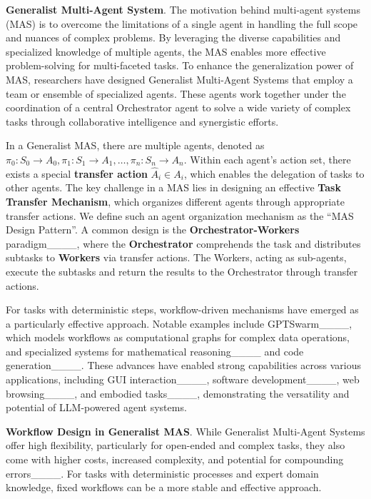 \textbf{Generalist Multi-Agent System}. The motivation behind multi-agent systems (MAS) is to overcome the limitations of a single agent in handling the full scope and nuances of complex problems. By leveraging the diverse capabilities and specialized knowledge of multiple agents, the MAS enables more effective problem-solving for multi-faceted tasks. To enhance the generalization power of MAS, researchers have designed Generalist Multi-Agent Systems that employ a team or ensemble of specialized agents. These agents work together under the coordination of a central Orchestrator agent to solve a wide variety of complex tasks through collaborative intelligence and synergistic efforts.

In a Generalist MAS, there are multiple agents, denoted as $\pi_0: S_0 \rightarrow A_0, \pi_1: S_1 \rightarrow A_1, \dots, \pi_n: S_n \rightarrow A_n$. Within each agent's action set, there exists a special \textbf{transfer action} $\hat{A}_i \in A_i$, which enables the delegation of tasks to other agents. The key challenge in a MAS lies in designing an effective \textbf{Task Transfer Mechanism}, which organizes different agents through appropriate transfer actions. We define such an agent organization mechanism as the ``MAS Design Pattern''. A common design is the \textbf{Orchestrator-Workers} paradigm____, where the \textbf{Orchestrator} comprehends the task and distributes subtasks to \textbf{Workers} via transfer actions. The Workers, acting as sub-agents, execute the subtasks and return the results to the Orchestrator through transfer actions.

For tasks with deterministic steps, workflow-driven mechanisms have emerged as a particularly effective approach. Notable examples include GPTSwarm____, which models workflows as computational graphs for complex data operations, and specialized systems for mathematical reasoning____ and code generation____. These advances have enabled strong capabilities across various applications, including GUI interaction____, software development____, web browsing____, and embodied tasks____, demonstrating the versatility and potential of LLM-powered agent systems.

\textbf{Workflow Design in Generalist MAS}. While Generalist Multi-Agent Systems offer high flexibility, particularly for open-ended and complex tasks, they also come with higher costs, increased complexity, and potential for compounding errors____. For tasks with deterministic processes and expert domain knowledge, fixed workflows can be a more stable and effective approach.

